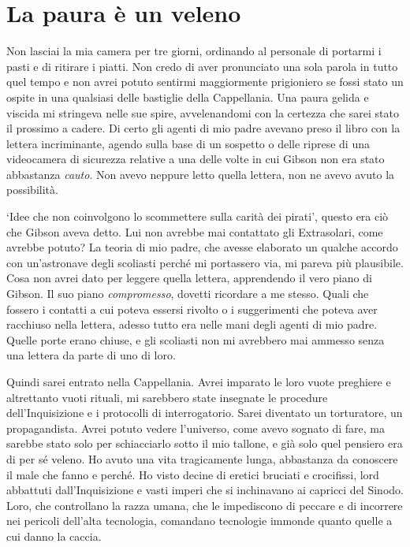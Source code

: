 \chapter{La paura è un veleno}

Non lasciai la mia camera per tre giorni, ordinando al personale di
portarmi i pasti e di ritirare i piatti. Non credo di aver pronunciato
una sola parola in tutto quel tempo e non avrei potuto sentirmi
maggiormente prigioniero se fossi stato un ospite in una qualsiasi delle
bastiglie della Cappellania. Una paura gelida e viscida mi stringeva
nelle sue spire, avvelenandomi con la certezza che sarei stato il
prossimo a cadere. Di certo gli agenti di mio padre avevano preso il
libro con la lettera incriminante, agendo sulla base di un sospetto o
delle riprese di una videocamera di sicurezza relative a una delle volte
in cui Gibson non era stato abbastanza \emph{cauto}. Non avevo neppure
letto quella lettera, non ne avevo avuto la possibilità.

`Idee che non coinvolgono lo scommettere sulla carità dei pirati',
questo era ciò che Gibson aveva detto. Lui non avrebbe mai contattato
gli Extrasolari, come avrebbe potuto? La teoria di mio padre, che avesse
elaborato un qualche accordo con un'astronave degli scoliasti perché mi
portassero via, mi pareva più plausibile. Cosa non avrei dato per
leggere quella lettera, apprendendo il vero piano di Gibson. Il suo
piano \emph{compromesso}, dovetti ricordare a me stesso. Quali che
fossero i contatti a cui poteva essersi rivolto o i suggerimenti che
poteva aver racchiuso nella lettera, adesso tutto era nelle mani degli
agenti di mio padre. Quelle porte erano chiuse, e gli scoliasti non mi
avrebbero mai ammesso senza una lettera da parte di uno di loro.

Quindi sarei entrato nella Cappellania. Avrei imparato le loro vuote
preghiere e altrettanto vuoti rituali, mi sarebbero state insegnate le
procedure dell'Inquisizione e i protocolli di interrogatorio. Sarei
diventato un torturatore, un propagandista. Avrei potuto vedere
l'universo, come avevo sognato di fare, ma sarebbe stato solo per
schiacciarlo sotto il mio tallone, e già solo quel pensiero era di per
sé veleno. Ho avuto una vita tragicamente lunga, abbastanza da conoscere
il male che fanno e perché. Ho visto decine di eretici bruciati e
crocifissi, lord abbattuti dall'Inquisizione e vasti imperi che si
inchinavano ai capricci del Sinodo. Loro, che controllano la razza
umana, che le impediscono di peccare e di incorrere nei pericoli
dell'alta tecnologia, comandano tecnologie immonde quanto quelle a cui
danno la caccia.

